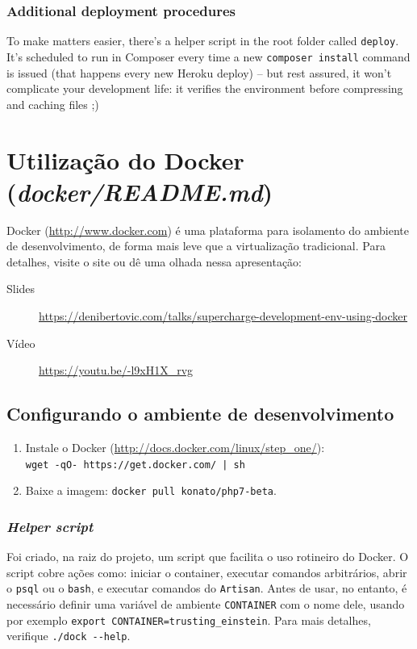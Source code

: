 \documentclass[12pt,a4paper,twoside,hyphens,english,brazil]{abntex2}
\begin{document}
{\begin{otherlanguage}{english}
\subsubsection{Additional deployment procedures}
To make matters easier, there's a helper script in the root folder called \texttt{deploy}. It's scheduled to run in Composer every time a new \texttt{composer install} command is issued (that happens every new Heroku deploy) -- but rest assured, it won't complicate your development life: it verifies the environment before compressing and caching files ;)

\end{otherlanguage}


\section{Utilização do Docker (\emph{docker/README.md})}

Docker (\url{http://www.docker.com}) é uma plataforma para isolamento do ambiente de desenvolvimento, de forma mais leve que a virtualização tradicional. Para detalhes, visite o site ou dê uma olhada nessa apresentação:
\begin{description}
	\item[Slides] \url{https://denibertovic.com/talks/supercharge-development-env-using-docker}
	\item[Vídeo] \url{https://youtu.be/-l9xH1X_rvg}
\end{description}

\subsection{Configurando o ambiente de desenvolvimento}
\begin{enumerate}
	\item Instale o Docker (\url{http://docs.docker.com/linux/step_one/}):\\ \texttt{wget -qO- https://get.docker.com/ | sh} 
	\item Baixe a imagem: \texttt{docker pull konato/php7-beta}.
\end{enumerate}

\subsubsection{\emph{Helper script}}
Foi criado, na raiz do projeto, um script que facilita o uso rotineiro do Docker. O script cobre ações como: iniciar o container, executar comandos arbitrários, abrir o \texttt{psql} ou o \texttt{bash}, e executar comandos do \texttt{Artisan}. Antes de usar, no entanto, é necessário definir uma variável de ambiente \texttt{CONTAINER} com o nome dele, usando por exemplo \texttt{export CONTAINER=trusting\_einstein}. Para mais detalhes, verifique \texttt{./dock -{}-help}.

}
\end{document}
